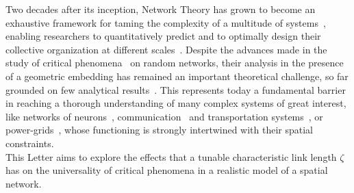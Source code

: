 \documentclass[aps, groupedaddress, superscriptaddress, prl, reprint]{revtex4-1}
\begin{document}
\maketitle
Two decades after its inception, Network Theory has grown to become an exhaustive framework for taming the complexity of a multitude of systems~\cite{books}, enabling researchers to quantitatively predict and to optimally design their collective organization at different scales~\cite{NetBioMed,community,multi,Yan017}. 
Despite the advances made in the study of critical phenomena~\cite{Collective} on random networks, their analysis in the presence of a geometric embedding has remained an important theoretical challenge, so far grounded on few analytical results~\cite{Bun008,bra010,bar011,Li2011,Bart18}.
This represents today a fundamental barrier in reaching a thorough understanding of many complex systems of great interest, like networks of neurons~\cite{Betzel2017,breakspear17}, communication~\cite{Lam008} and transportation systems~\cite{Li2018}, or power-grids~\cite{Mot017}, whose functioning is strongly intertwined with their spatial constraints. \\
\indent 
This Letter aims to explore the effects that a tunable characteristic link length $\zeta$ has on the universality of critical phenomena in a realistic model of a spatial network.
\end{document}

